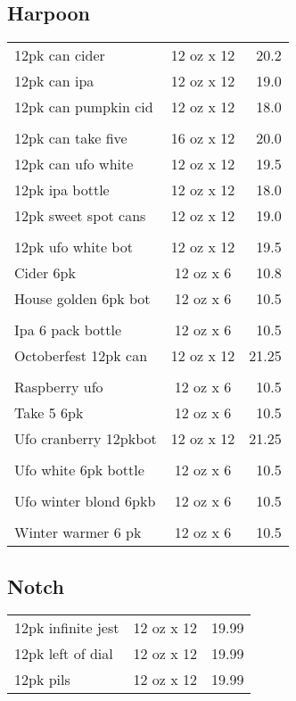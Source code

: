 \documentclass{article}%
\begin{document}
\begin{multicols}{3}
%
\subsection*{Harpoon}%
\begin{tabular}{l c r}%
12pk can cider&12 oz x 12&20.2\\%
12pk can ipa&12 oz x 12&19.0\\%
\multirow{1}{15ex}{12pk can pumpkin cid}&12 oz x 12&18.0\\%
&&\\%
12pk can take five&16 oz x 12&20.0\\%
12pk can ufo white&12 oz x 12&19.5\\%
12pk ipa bottle&12 oz x 12&18.0\\%
\multirow{1}{15ex}{12pk sweet spot cans}&12 oz x 12&19.0\\%
&&\\%
12pk ufo white bot&12 oz x 12&19.5\\%
Cider 6pk&12 oz x 6&10.8\\%
\multirow{1}{15ex}{House golden 6pk bot}&12 oz x 6&10.5\\%
&&\\%
Ipa 6 pack bottle&12 oz x 6&10.5\\%
\multirow{1}{15ex}{Octoberfest 12pk can}&12 oz x 12&21.25\\%
&&\\%
Raspberry ufo&12 oz x 6&10.5\\%
Take 5 6pk&12 oz x 6&10.5\\%
\multirow{1}{15ex}{Ufo cranberry 12pkbot }&12 oz x 12&21.25\\%
&&\\%
\multirow{1}{15ex}{Ufo white 6pk bottle}&12 oz x 6&10.5\\%
&&\\%
\multirow{1}{15ex}{Ufo winter blond 6pkb}&12 oz x 6&10.5\\%
&&\\%
Winter warmer 6 pk&12 oz x 6&10.5\\%
\end{tabular}

%
\subsection*{Notch}%
\begin{tabular}{l c r}%
12pk infinite jest&12 oz x 12&19.99\\%
12pk left of dial&12 oz x 12&19.99\\%
12pk pils&12 oz x 12&19.99\\%
\end{tabular}


\end{multicols}
\end{document}
